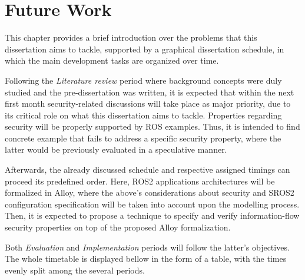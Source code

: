 \chapter{Future Work}\label{c:currWork}

This chapter provides a brief introduction over the problems that this dissertation aims to tackle, supported by a graphical dissertation schedule, in which the main development tasks are organized over time.

Following the \textit{Literature review} period where background concepts were duly studied and the pre-dissertation was written, it is expected that within the next first month security-related discussions will take place as major priority, due to its critical role on what this dissertation aims to tackle. Properties regarding security will be properly supported by ROS examples. Thus, it is intended to find concrete example that fails to address a specific security property, where the latter would be previously evaluated in a speculative manner. 

Afterwards, the already discussed schedule and respective assigned timings can proceed its predefined order. Here, ROS2 applications architectures will be formalized in Alloy, where the above's considerations about security and SROS2 configuration specification will be taken into account upon the modelling process. Then, it is expected to propose  a technique to specify and verify information-flow security properties on top of the proposed Alloy formalization.

Both \textit{Evaluation} and \textit{Implementation} periods will follow the latter's objectives. The whole timetable is displayed bellow in the form of a table, with the times evenly split among the several periods. 